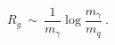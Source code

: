 \begin{equation}
\label{rad}
R_g\ \sim\ \frac1{m_\gamma}\log{\frac{m_\gamma}{m_q}}\ .
\end{equation}

